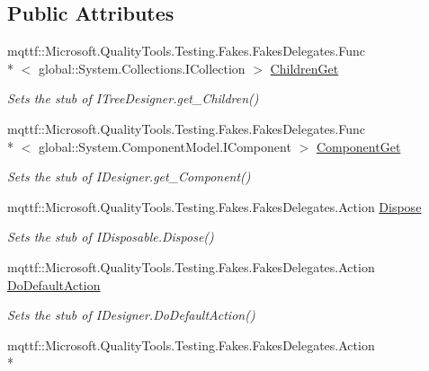 \subsection*{Public Attributes}
\begin{DoxyCompactItemize}
\item 
mqttf\-::\-Microsoft.\-Quality\-Tools.\-Testing.\-Fakes.\-Fakes\-Delegates.\-Func\\*
$<$ global\-::\-System.\-Collections.\-I\-Collection $>$ \hyperlink{class_system_1_1_component_model_1_1_design_1_1_fakes_1_1_stub_i_tree_designer_a4131479a447a2cc775b9310519ad05f6}{Children\-Get}
\begin{DoxyCompactList}\small\item\em Sets the stub of I\-Tree\-Designer.\-get\-\_\-\-Children()\end{DoxyCompactList}\item 
mqttf\-::\-Microsoft.\-Quality\-Tools.\-Testing.\-Fakes.\-Fakes\-Delegates.\-Func\\*
$<$ global\-::\-System.\-Component\-Model.\-I\-Component $>$ \hyperlink{class_system_1_1_component_model_1_1_design_1_1_fakes_1_1_stub_i_tree_designer_a4c7af58ccf0ded20fc0ca2ef83bdc23b}{Component\-Get}
\begin{DoxyCompactList}\small\item\em Sets the stub of I\-Designer.\-get\-\_\-\-Component()\end{DoxyCompactList}\item 
mqttf\-::\-Microsoft.\-Quality\-Tools.\-Testing.\-Fakes.\-Fakes\-Delegates.\-Action \hyperlink{class_system_1_1_component_model_1_1_design_1_1_fakes_1_1_stub_i_tree_designer_aebe1d8a1183cac6825b7f9d2ef5bdd8c}{Dispose}
\begin{DoxyCompactList}\small\item\em Sets the stub of I\-Disposable.\-Dispose()\end{DoxyCompactList}\item 
mqttf\-::\-Microsoft.\-Quality\-Tools.\-Testing.\-Fakes.\-Fakes\-Delegates.\-Action \hyperlink{class_system_1_1_component_model_1_1_design_1_1_fakes_1_1_stub_i_tree_designer_a5b9b1259018f832e83505ce89eec2e95}{Do\-Default\-Action}
\begin{DoxyCompactList}\small\item\em Sets the stub of I\-Designer.\-Do\-Default\-Action()\end{DoxyCompactList}\item 
mqttf\-::\-Microsoft.\-Quality\-Tools.\-Testing.\-Fakes.\-Fakes\-Delegates.\-Action\\*

\end{DoxyCompactItemize}

